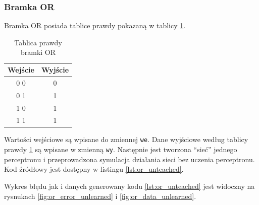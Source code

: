 \documentclass[pointlessnumbers, abstracton, headsepline, a4paper]{scrartcl}
\begin{document}
\subsubsection{Bramka OR}

Bramka OR posiada tablice prawdy pokazaną w tablicy \ref{tab:or}.

\begin{table}[h]
\centering
\begin{tabular}[t]{c|c}
Wejście & Wyjście \\
\hline
0 0 & 0 \\
0 1 & 1 \\
1 0 & 1 \\
1 1 & 1 \\
\end{tabular}
\caption{\label{tab:or}Tablica prawdy bramki OR}
\end{table}

Wartości wejściowe są wpisane do zmiennej \texttt{we}. Dane wyjściowe według tablicy prawdy \ref{tab:or} są wpisane w zmienną \texttt{wy}. Następnie jest tworzona ``sieć'' jednego perceptronu i przeprowadzona symulacja działania sieci bez uczenia perceptronu. Kod źródłowy jest dostępny w listingu \ref{lst:or_unteached}.

\begin{center}
\begin{minipage}{0.5\textwidth}
\lstset{captionpos=b,caption=Kod nie uczonej bramki OR,label=lst:or_unteached}

\end{minipage}
\end{center}

Wykres błędu jak i danych generowany kodu \ref{lst:or_unteached} jest widoczny na rysnukach \ref{fig:or_error_unlearned} i \ref{fig:or_data_unlearned}.
\end{document}

